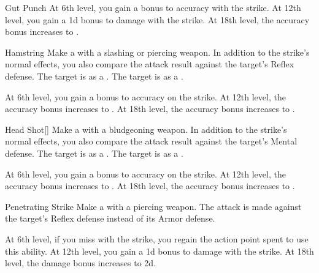 {\begin{ability}{Gut Punch}
                At 6th level, you gain a  bonus to accuracy with the strike.
                At 12th level, you gain a \plus1d bonus to damage with the strike.
                At 18th level, the accuracy bonus increases to .
            \end{ability}

            \begin{ability}{Hamstring}
                Make a  with a slashing or piercing weapon.
                In addition to the strike's normal effects, you also compare the attack result against the target's Reflex defense.
                \hit The target is  as a .
                \crit The target is  as a .

                At 6th level, you gain a  bonus to accuracy on the strike.
                At 12th level, the accuracy bonus increases to .
                At 18th level, the accuracy bonus increases to .
            \end{ability}

            \begin{ability}{Head Shot}[]
                Make a  with a bludgeoning weapon.
                In addition to the strike's normal effects, you also compare the attack result against the target's Mental defense.
                \hit The target is  as a .
                \crit The target is  as a .

                At 6th level, you gain a  bonus to accuracy on the strike.
                At 12th level, the accuracy bonus increases to .
                At 18th level, the accuracy bonus increases to .
            \end{ability}

            \begin{ability}{Penetrating Strike}
                Make a  with a piercing weapon.
                The attack is made against the target's Reflex defense instead of its Armor defense.

                At 6th level, if you miss with the strike, you regain the action point spent to use this ability.
                At 12th level, you gain a \plus1d bonus to damage with the strike.
                At 18th level, the damage bonus increases to \plus2d.
            \end{ability}

}

